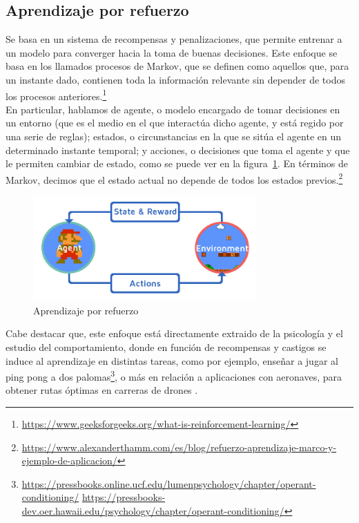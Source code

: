 \subsection{Aprendizaje por refuerzo}
\label{subsec:aprendizaje_por_refuerzo}

Se basa en un sistema de recompensas y penalizaciones, que permite entrenar a un modelo para converger hacia la toma de buenas decisiones. Este enfoque se basa en los llamados procesos de Markov, que se definen como aquellos que, para un instante dado, contienen toda la información relevante sin depender de todos los procesos anteriores.\footnote[17]{\url{https://www.geeksforgeeks.org/what-is-reinforcement-learning/}}\\

En particular, hablamos de agente, o modelo encargado de tomar decisiones en un entorno (que es el medio en el que interactúa dicho agente, y está regido por una serie de reglas); estados, o circunstancias en la que se sitúa el agente en un determinado instante temporal; y acciones, o decisiones que toma el agente y que le permiten cambiar de estado, como se puede ver en la figura~\ref{fig:reinforcement_learning}. En términos de Markov, decimos que el estado actual no depende de todos los estados previos.\footnote[18]{\url{https://www.alexanderthamm.com/es/blog/refuerzo-aprendizaje-marco-y-ejemplo-de-aplicacion/}}\\

\begin{figure} [tp]
	\begin{center}
	\includegraphics[height=4cm]{imagenes/cap1/9_reinforcement.png}
	\end{center}
	\caption[Aprendizaje por refuerzo]{Aprendizaje por refuerzo}
	\label{fig:reinforcement_learning}
\end{figure}

Cabe destacar que, este enfoque está directamente extraido de la psicología y el estudio del comportamiento, donde en función de recompensas y castigos se induce al aprendizaje en distintas tareas, como por ejemplo, enseñar a jugar al ping pong a dos palomas\footnote[19]{\url{https://pressbooks.online.ucf.edu/lumenpsychology/chapter/operant-conditioning/} \url{https://pressbooks-dev.oer.hawaii.edu/psychology/chapter/operant-conditioning/}}, o más en relación a aplicaciones con aeronaves, para obtener rutas óptimas en carreras de drones \cite{9636053}.\\

